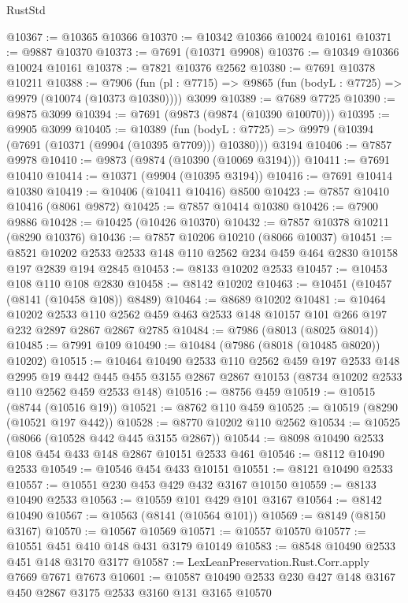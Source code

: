 \begin{lexlean}{RustStd}
\begin{coremodule}
@10367 := @10365 @10366
@10370 := @10342 @10366 @10024 @10161
@10371 := @9887 @10370
@10373 := @7691 (@10371 @9908)
@10376 := @10349 @10366 @10024 @10161
@10378 := @7821 @10376 @2562
@10380 := @7691 @10378 @10211
@10388 := @7906
    (fun (pl : @7715) => @9865 (fun (bodyL : @7725) => @9979 (@10074 (@10373 @10380))))
    @3099
@10389 := @7689 @7725
@10390 := @9875 @3099
@10394 := @7691 (@9873 (@9874 (@10390 @10070)))
@10395 := @9905 @3099
@10405 := @10389
    (fun (bodyL : @7725) => @9979 (@10394 (@7691 (@10371 (@9904 (@10395 @7709))) @10380)))
    @3194
@10406 := @7857 @9978
@10410 := @9873 (@9874 (@10390 (@10069 @3194)))
@10411 := @7691 @10410
@10414 := @10371 (@9904 (@10395 @3194))
@10416 := @7691 @10414 @10380
@10419 := @10406 (@10411 @10416) @8500
@10423 := @7857 @10410 @10416 (@8061 @9872)
@10425 := @7857 @10414 @10380
@10426 := @7900 @9886
@10428 := @10425 (@10426 @10370)
@10432 := @7857 @10378 @10211 (@8290 @10376)
@10436 := @7857 @10206 @10210 (@8066 @10037)
@10451 := @8521 @10202 @2533 @2533 @148 @110 @2562 @234 @459 @464 @2830 @10158 @197 @2839 @194 @2845
@10453 := @8133 @10202 @2533
@10457 := @10453 @108 @110 @108 @2830
@10458 := @8142 @10202
@10463 := @10451 (@10457 (@8141 (@10458 @108)) @8489)
@10464 := @8689 @10202
@10481 := @10464
    @10202
    @2533
    @110
    @2562
    @459
    @463
    @2533
    @148
    @10157
    @101
    @266
    @197
    @232
    @2897
    @2867
    @2867
    @2785
@10484 := @7986 (@8013 (@8025 @8014))
@10485 := @7991 @109
@10490 := @10484 (@7986 (@8018 (@10485 @8020)) @10202)
@10515 := @10464
    @10490
    @2533
    @110
    @2562
    @459
    @197
    @2533
    @148
    @2995
    @19
    @442
    @445
    @455
    @3155
    @2867
    @2867
    @10153
    (@8734 @10202 @2533 @110 @2562 @459 @2533 @148)
@10516 := @8756 @459
@10519 := @10515 (@8744 (@10516 @19))
@10521 := @8762 @110 @459
@10525 := @10519 (@8290 (@10521 @197 @442))
@10528 := @8770 @10202 @110 @2562
@10534 := @10525 (@8066 (@10528 @442 @445 @3155 @2867))
@10544 := @8098 @10490 @2533 @108 @454 @433 @148 @2867 @10151 @2533 @461
@10546 := @8112 @10490 @2533
@10549 := @10546 @454 @433 @10151
@10551 := @8121 @10490 @2533
@10557 := @10551 @230 @453 @429 @432 @3167 @10150
@10559 := @8133 @10490 @2533
@10563 := @10559 @101 @429 @101 @3167
@10564 := @8142 @10490
@10567 := @10563 (@8141 (@10564 @101))
@10569 := @8149 (@8150 @3167)
@10570 := @10567 @10569
@10571 := @10557 @10570
@10577 := @10551 @451 @410 @148 @431 @3179 @10149
@10583 := @8548 @10490 @2533 @451 @148 @3170 @3177
@10587 := LexLeanPreservation.Rust.Corr.apply @7669 @7671 @7673
@10601 := @10587 @10490 @2533 @230 @427 @148 @3167 @450 @2867 @3175 @2533 @3160 @131 @3165 @10570

\end{coremodule}
\end{lexlean}
